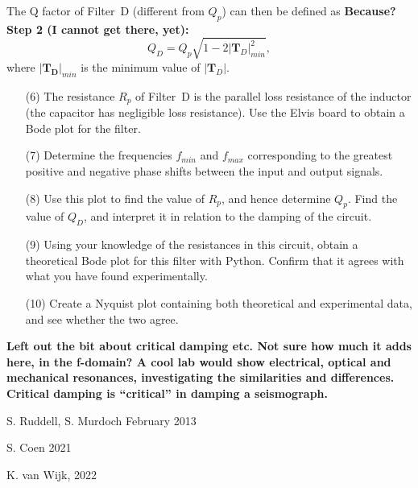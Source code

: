 \documentclass{article}
\begin{document}
The Q factor of Filter~D (different from $Q_p$) can then be defined as
{\bf Because? Step 2 (I cannot get there, yet):}
\begin{equation}
  Q_D=Q_p\sqrt{1-2|\mathbf{T}_{D}|_{min}^2},
\end{equation}
where $|\mathbf{T_D}|_{min}$ is the minimum value of $|\mathbf{T}_D|$.

\begin{enumerate}
\item[(6)] The resistance $R_p$ of Filter~D is the parallel loss
  resistance of the inductor (the capacitor has negligible loss
  resistance).  Use the Elvis board to obtain a Bode plot for the
  filter.
  
\item[(7)] Determine the frequencies $f_{min}$ and $f_{max}$
  corresponding to the greatest positive and negative phase shifts
  between the input and output signals. %
  
\item[(8)] Use this plot to find the value of $R_p$, and hence
  determine $Q_p$. Find the value of $Q_D$, and interpret it in
  relation to the damping of the circuit.
  
\item[(9)] Using your knowledge of the resistances in this circuit,
  obtain a theoretical Bode plot for this filter with Python. Confirm
  that it agrees with what you have found experimentally.
  
\item[(10)] Create a Nyquist plot containing both theoretical and
  experimental data, and see whether the two agree.
\end{enumerate}
  
{\bf Left out the bit about critical damping etc. Not sure how much it
  adds here, in the f-domain? A cool lab would show electrical,
  optical and mechanical resonances, investigating the similarities
  and differences. Critical damping is ``critical'' in damping a
  seismograph.}

S. Ruddell, S. Murdoch February 2013

S. Coen 2021

K. van Wijk, 2022
\end{document}
